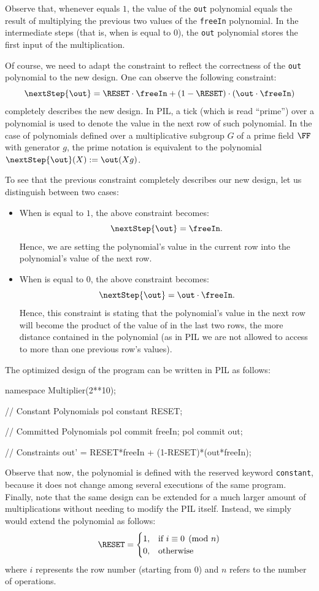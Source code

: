 Observe that, whenever \RESET equals $1$, the value of the \texttt{out} polynomial equals the result of multiplying the previous two values of the \texttt{freeIn} polynomial. In the intermediate steps (that is, when \RESET is equal to $0$), the \texttt{out} polynomial stores the first input of the multiplication. 

Of course, we need to adapt the \Multiplier constraint to reflect the correctness of the \texttt{out} polynomial to the new design. One can observe the following constraint:
\[
\nextStep{\out} = \RESET \cdot \freeIn + (1 - \RESET) \cdot (\out \cdot \freeIn)
\]
completely describes the new design. In PIL, a tick \nextStep{} (which is read ``prime'') over a polynomial is used to denote the value in the next row of such polynomial. In the case of polynomials defined over a multiplicative subgroup $G$ of a prime field $\FF$ with generator $g$, the prime notation is equivalent to the polynomial $\nextStep{\out}(X) := \out(Xg)$.

To see that the previous constraint completely describes our new \Multiplier design, let us distinguish between two cases: 
\begin{itemize}
\item When \RESET is equal to $1$, the above constraint becomes:
\[
\nextStep{\out} = \freeIn.
\]
Hence, we are setting the \freeIn polynomial's value in the current row into the \out polynomial's value of the next row.

\item When \RESET is equal to $0$, the above constraint becomes:
\[
\nextStep{\out} = \out \cdot \freeIn.
\]
Hence, this constraint is stating that the \out polynomial's value in the next row will become the product of the value of \freeIn in the last two rows, the more distance contained in the \out polynomial (as in PIL we are not allowed to access to more than one previous row's values). 
\end{itemize}

The optimized design of the \Multiplier program can be written in PIL as follows:
\begin{pil}
namespace Multiplier(2**10);

    // Constant Polynomials
    pol constant RESET;

    // Committed Polynomials
    pol commit freeIn;
    pol commit out;

    // Constraints
    out' = RESET*freeIn + (1-RESET)*(out*freeIn);
\end{pil}
Observe that now, the polynomial \RESET is defined with the reserved keyword \texttt{constant}, because it does not change among several executions of the same program. Finally, note that the same design can be extended for a much larger amount of multiplications without needing to modify the PIL itself. Instead, we simply would extend the \RESET polynomial as follows:
\[
\RESET = 
\begin{cases}
1, & \text{if } i \equiv 0 \pmod{n} \\
0, & \text{otherwise}
\end{cases}
\]
where $i$ represents the row number (starting from $0$) and $n$ refers to the number of operations.




